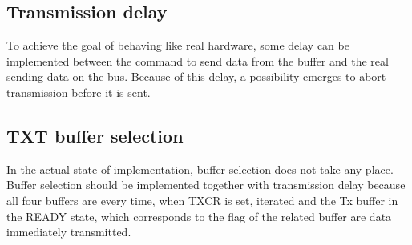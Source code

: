 \documentclass{ctuthesis}
\begin{document}
 \subsection{Transmission delay}
 To achieve the goal of behaving like real hardware, some delay can  be implemented between the command to send data from the buffer and the real sending data on the bus. Because of this delay, a possibility emerges to abort transmission before it is sent.
 
 \subsection{TXT buffer selection}
  In the actual state of implementation, buffer selection does not take any place. Buffer selection should be implemented together with transmission delay because all four buffers are every time, when TXCR is set, iterated and the Tx buffer in the READY state, which corresponds to the flag of the related buffer are data immediately transmitted.
 
\end{document}
